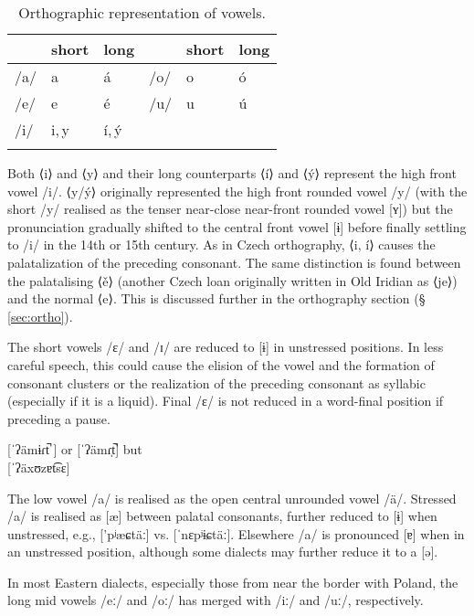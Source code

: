 \begin{table}[ht!]
	\footnotesize\sffamily
	\caption{Orthographic representation of vowels.}
	\medskip
	\begin{tabularx}{0.7\textwidth}{@{}YYYYYY@{}}
		\toprule
		& {\sc short} & {\sc long} & & {\sc short} & {\sc long}\\
		\midrule
		/a/ & a 	&á 			& /o/ 	& o &ó \\
		/e/ & e 	&é 			& /u/ 	& u &ú\\
		/i/ & i,\,y &í,\,\'y 	& 		& 	&\\
		\bottomrule
		\label{table:vowels-orth}
	\end{tabularx}
\end{table}

Both ⟨i⟩ and ⟨y⟩ and their long counterparts ⟨í⟩ and ⟨ý⟩ represent the high
front vowel /i/. ⟨y/ý⟩ originally represented the high front rounded vowel /y/
(with the short /y/ realised as the tenser near-close near-front rounded vowel
[ʏ]) but the pronunciation gradually shifted to the central front vowel [ɨ]
before finally settling to /i/ in the 14th or 15th century. As in
Czech orthography, ⟨i, í⟩ causes the palatalization of the
preceding consonant. The same distinction is found between the palatalising ⟨ě⟩
(another Czech loan originally written in Old Iridian as ⟨je⟩) and the normal
⟨e⟩. This is discussed further in the orthography section (\S\,\ref{sec:ortho}).

The short vowels /ɛ/ and /ɪ/ are reduced to [ɨ] in unstressed positions. In less
careful speech, this could cause the elision of the vowel and the formation of
consonant clusters or the realization of the preceding consonant as syllabic
(especially if it is a liquid). Final /ɛ/ is not reduced in a word-final
position if preceding a pause.

\ex
	 [ˈʔämɨɾt̚ ] or [ˈʔämɾ̩t̚] but\\
	 [ˈʔäxʊzɐt͡sɛ]
\xe

The low vowel /a/ is realised as the open central unrounded vowel /\"a/.
Stressed /a/ is realised as [\ae] between palatal consonants, further reduced to
[ɨ] when unstressed, e.g.,  ['pʲæɕtäː] vs. 
[ˈnɛpʲɨɕtäː]. Elsewhere /a/ is pronounced [ɐ] when in an unstressed position,
although some dialects may further reduce it to a [ə].

In most Eastern dialects, especially those from near the border with Poland, the
long mid vowels /eː/ and /oː/ has merged with /iː/ and /uː/, respectively.

